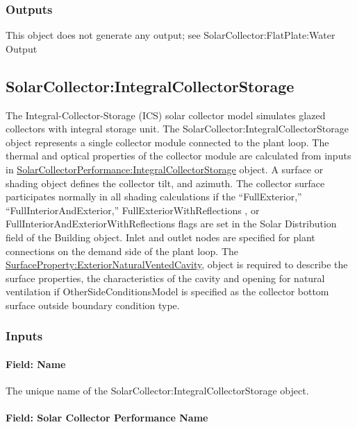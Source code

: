\subsubsection{Outputs}\label{outputs-1-025}

This object does not generate any output; see SolarCollector:FlatPlate:Water Output

\subsection{SolarCollector:IntegralCollectorStorage}\label{solarcollectorintegralcollectorstorage}

The Integral-Collector-Storage (ICS) solar collector model simulates glazed collectors with integral storage unit. The SolarCollector:IntegralCollectorStorage object represents a single collector module connected to the plant loop. The thermal and optical properties of the collector module are calculated from inputs in \hyperref[solarcollectorperformanceintegralcollectorstorage]{SolarCollectorPerformance:IntegralCollectorStorage} object. A surface or shading object defines the collector tilt, and azimuth. The collector surface participates normally in all shading calculations if the ``FullExterior,'' ``FullInteriorAndExterior,'' FullExteriorWithReflections , or FullInteriorAndExteriorWithReflections flags are set in the Solar Distribution field of the Building object. Inlet and outlet nodes are specified for plant connections on the demand side of the plant loop. The \hyperref[surfacepropertyexteriornaturalventedcavity]{SurfaceProperty:ExteriorNaturalVentedCavity}, object is required to describe the surface properties, the characteristics of the cavity and opening for natural ventilation if OtherSideConditionsModel is specified as the collector bottom surface outside boundary condition type.

\subsubsection{Inputs}\label{inputs-2-039}

\paragraph{Field: Name}\label{field-name-2-036}

The unique name of the SolarCollector:IntegralCollectorStorage object.

\paragraph{Field: Solar Collector Performance Name}\label{field-solar-collector-performance-name-1}

